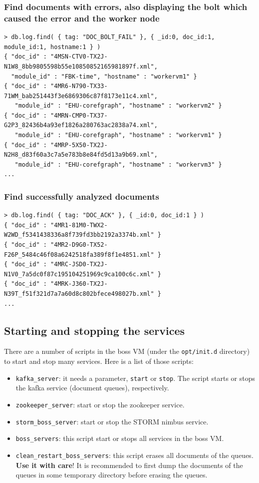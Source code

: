 \documentclass[a4]{article}
\begin{document}
\subsubsection*{Find documents with errors, also displaying the bolt which caused the error and the worker node}

\begin{verbatim}
> db.log.find( { tag: "DOC_BOLT_FAIL" }, { _id:0, doc_id:1, module_id:1, hostname:1 } )
{ "doc_id" : "4MSN-CTV0-TX2J-N1W8_8bb9805598b55e10850852165981897f.xml", 
  "module_id" : "FBK-time", "hostname" : "workervm1" }
{ "doc_id" : "4MR6-N790-TX33-71WM_bab251443f3e6869306c87f8173e11c4.xml", 
   "module_id" : "EHU-corefgraph", "hostname" : "workervm2" }
{ "doc_id" : "4MRN-CMP0-TX37-G2P3_82436b4a93ef1826a280763ac2838a74.xml", 
   "module_id" : "EHU-corefgraph", "hostname" : "workervm1" }
{ "doc_id" : "4MRP-5X50-TX2J-N2H8_d83f60a3c7a5e783b8e84fd5d13a9b69.xml", 
   "module_id" : "EHU-corefgraph", "hostname" : "workervm3" }
...
\end{verbatim}

\subsubsection*{Find successfully analyzed documents}

\begin{verbatim}
> db.log.find( { tag: "DOC_ACK" }, { _id:0, doc_id:1 } )
{ "doc_id" : "4MR1-81M0-TWX2-W2WD_f5341438336a8f739fd3bb2192a3374b.xml" }
{ "doc_id" : "4MR2-D9G0-TX52-F26P_5484c46f08a6242518fa389f8f1e4851.xml" }
{ "doc_id" : "4MRC-JSD0-TX2J-N1V0_7a5dc0f87c195104251969c9ca100c6c.xml" }
{ "doc_id" : "4MRK-J360-TX2J-N39T_f51f321d7a7a60d8c802bfece498027b.xml" }
...
\end{verbatim}

\subsection{Starting and stopping the services}
\label{sec:start-stopp-serv}

There are a number of scripts in the boss VM (under the \texttt{opt/init.d}
directory) to start and stop many services. Here is a list of those scripts:
\begin{itemize}
\item \texttt{kafka\_server}: it needs a parameter, \texttt{start} or
  \texttt{stop}. The script starts or stops the kafka service (document
  queues), respectively.
\item \texttt{zookeeper\_server}: start or stop the zookeeper service.
\item \texttt{storm\_boss\_server}: start or stop the STORM nimbus service.
\item \texttt{boss\_servers}: this script start or stops all services in the
  boss VM.
\item \texttt{clean\_restart\_boss\_servers}: this script erases all
  documents of the queues. \textbf{Use it with care}! It is recommended to
  first dump the documents of the queues in some temporary directory before
  erasing the queues.
\end{itemize}
\end{document}

